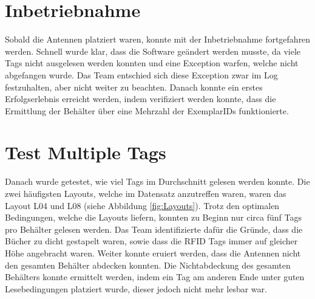 \documentclass[parskip=full, a4paper]{scrartcl}
\begin{document}
\section{Inbetriebnahme}
Sobald die Antennen platziert waren, konnte mit der Inbetriebnahme fortgefahren werden. Schnell wurde klar, dass die Software geändert werden musste, da viele Tags nicht ausgelesen werden konnten und eine Exception warfen, welche nicht abgefangen wurde. Das Team entschied sich diese Exception zwar im Log festzuhalten, aber nicht weiter zu beachten. Danach konnte ein erstes Erfolgserlebnis erreicht werden, indem verifiziert werden konnte, dass die Ermittlung der Behälter über eine Mehrzahl der ExemplarIDs funktionierte.

\section{Test Multiple Tags}
Danach wurde getestet, wie viel Tags im Durchschnitt gelesen werden konnte. Die zwei häufigsten Layouts, welche im Datensatz anzutreffen waren, waren das Layout L04 und L08 (siehe Abbildung \ref{fig:Layouts}). Trotz den optimalen Bedingungen, welche die Layouts liefern, konnten zu Beginn nur circa fünf Tags pro Behälter gelesen werden. Das Team identifizierte dafür die Gründe, dass die Bücher zu dicht gestapelt waren, sowie dass die RFID Tags immer auf gleicher Höhe angebracht waren. Weiter konnte eruiert werden, dass die Antennen nicht den gesamten Behälter abdecken konnten. Die Nichtabdeckung des gesamten Behälters konnte ermittelt werden, indem ein Tag am anderen Ende unter guten Lesebedingungen platziert wurde, dieser jedoch nicht mehr lesbar war.
\end{document}
